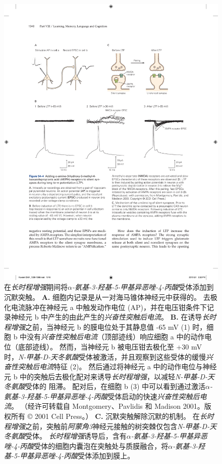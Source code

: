 \begin{figure}[htbp]
	\centering
	\includegraphics[width=0.85\linewidth]{chap54/fig_54_4}
	\caption{在\textit{长时程增强}期间将\textit{$\alpha$-氨基-3-羟基-5-甲基异恶唑-4-丙酸}受体添加到沉默突触。
		\textbf{A.} 细胞内记录是从一对海马锥体神经元中获得的。 去极化电流脉冲在神经元 a 中触发动作电位 (AP)，并在电压钳条件下记录神经元 b 中产生的由此产生的\textit{兴奋性突触后电流}。
		\textbf{B.} 在诱导\textit{长时程增强}之前，当神经元 b 的膜电位处于其静息值 -65 mV (1) 时，细胞 b 中没有\textit{兴奋性突触后电流}（顶部迹线）响应细胞 a 中的动作电位（底部迹线）。
		然而，当神经元 b 被电压钳去极化至 +30 mV 时，\textit{N-甲基-D-天冬氨酸}受体被激活，并且观察到这些受体的缓慢\textit{兴奋性突触后电流}特征 (2)。
		然后通过将神经元 a 中的动作电位与神经元 b 中的突触后去极化配对来诱导\textit{长时程增强}，以减轻\textit{N-甲基-D-天冬氨酸}受体的  阻滞。
		配对后，在细胞 b (3) 中可以看到通过激活\textit{$\alpha$-氨基-3-羟基-5-甲基异恶唑-4-丙酸}受体启动的快速\textit{兴奋性突触后电流}。
		（经许可转载自 Montgomery、Pavlidis 和 Madison 2001。版权所有 © 2001 Cell Press。）
		\textbf{C.} 沉默突触解除沉默的机制。
		在\textit{长时程增强}之前，突触前\textit{阿蒙角3}神经元接触的树突棘仅包含\textit{N-甲基-D-天冬氨酸}受体。
		\textit{长时程增强}诱导后，含有\textit{$\alpha$-氨基-3-羟基-5-甲基异恶唑-4-丙酸}受体的细胞内囊泡在突触处与质膜融合，将\textit{$\alpha$-氨基-3-羟基-5-甲基异恶唑-4-丙酸}受体添加到膜上。}
	\label{fig:54_4}
\end{figure}


